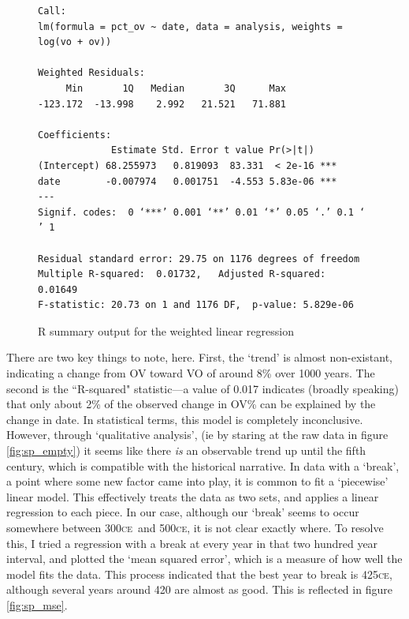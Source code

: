 \documentclass[11pt,a4paper]{scrartcl} %
\newcommand{\ce}{\textsc{ce}\ }
\begin{document}
\begin{figure}[H]
\centering
\caption{R summary output for the weighted linear regression}
\label{fig:r_single}
\phantom{xxx}
\begin{Verbatim}[fontsize=\small]
Call:
lm(formula = pct_ov ~ date, data = analysis, weights = log(vo + ov))

Weighted Residuals:
     Min       1Q   Median       3Q      Max 
-123.172  -13.998    2.992   21.521   71.881 

Coefficients:
             Estimate Std. Error t value Pr(>|t|)    
(Intercept) 68.255973   0.819093  83.331  < 2e-16 ***
date        -0.007974   0.001751  -4.553 5.83e-06 ***
---
Signif. codes:  0 ‘***’ 0.001 ‘**’ 0.01 ‘*’ 0.05 ‘.’ 0.1 ‘ ’ 1

Residual standard error: 29.75 on 1176 degrees of freedom
Multiple R-squared:  0.01732,   Adjusted R-squared:  0.01649 
F-statistic: 20.73 on 1 and 1176 DF,  p-value: 5.829e-06
\end{Verbatim}
\end{figure}

\noindent There are two key things to note, here. First, the `trend' is almost non-existant, indicating a change from OV toward VO of around 8\% over 1000 years. The second is the ``R-squared" statistic---a value of 0.017 indicates (broadly speaking) that only about 2\% of the observed change in OV\% can be explained by the change in date. In statistical terms, this model is completely inconclusive. However, through `qualitative analysis', (ie by staring at the raw data in figure \ref{fig:sp_empty}) it seems like there \textit{is} an observable trend up until the fifth century, which is compatible with the historical narrative. In data with a `break', a point where some new factor came into play, it is common to fit a `piecewise' linear model. This effectively treats the data as two sets, and applies a linear regression to each piece. In our case, although our `break' seems to occur somewhere between 300\ce and 500\textsc{ce}, it is not clear exactly where. To resolve this, I tried a regression with a break at every year in that two hundred year interval, and plotted the `mean squared error', which is a measure of how well the model fits the data. This process indicated that the best year to break is 425\textsc{ce}, although several years around 420 are almost as good. This is reflected in figure \ref{fig:sp_mse}.
\end{document}
